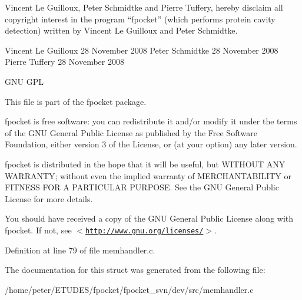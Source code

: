 Vincent Le Guilloux, Peter Schmidtke and Pierre Tuffery, hereby disclaim all copyright interest in the program “fpocket” (which performs protein cavity detection) written by Vincent Le Guilloux and Peter Schmidtke.

Vincent Le Guilloux 28 November 2008 Peter Schmidtke 28 November 2008 Pierre Tuffery 28 November 2008

GNU GPL

This file is part of the fpocket package.

fpocket is free software: you can redistribute it and/or modify it under the terms of the GNU General Public License as published by the Free Software Foundation, either version 3 of the License, or (at your option) any later version.

fpocket is distributed in the hope that it will be useful, but WITHOUT ANY WARRANTY; without even the implied warranty of MERCHANTABILITY or FITNESS FOR A PARTICULAR PURPOSE. See the GNU General Public License for more details.

You should have received a copy of the GNU General Public License along with fpocket. If not, see $<$\href{http://www.gnu.org/licenses/}{\tt http://www.gnu.org/licenses/}$>$. 

Definition at line 79 of file memhandler.c.

The documentation for this struct was generated from the following file:\begin{CompactItemize}
\item 
/home/peter/ETUDES/fpocket/fpocket\_\-svn/dev/src/memhandler.c\end{CompactItemize}
